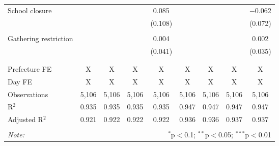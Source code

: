 \begin{table}[!htbp]
\begin{tabular}{@{\extracolsep{-15pt}}lcccccccc}
 School closure &  &  &  & 0.085 &  &  &  & $-$0.062 \\ 
  &  &  &  & (0.108) &  &  &  & (0.072) \\ 
  & & & & & & & & \\ 
 Gathering restriction &  &  &  & 0.004 &  &  &  & 0.002 \\ 
  &  &  &  & (0.041) &  &  &  & (0.035) \\ 
  & & & & & & & & \\ 
\hline \\[-1.8ex] 
Prefecture FE & X & X & X & X & X & X & X & X \\ 
Day FE & X & X & X & X & X & X & X & X \\ 
Observations & 5,106 & 5,106 & 5,106 & 5,106 & 5,106 & 5,106 & 5,106 & 5,106 \\ 
R$^{2}$ & 0.935 & 0.935 & 0.935 & 0.935 & 0.947 & 0.947 & 0.947 & 0.947 \\ 
Adjusted R$^{2}$ & 0.921 & 0.922 & 0.922 & 0.922 & 0.936 & 0.936 & 0.937 & 0.937 \\ 
\hline 
\hline \\[-1.8ex] 
\textit{Note:}  & \multicolumn{8}{r}{$^{*}$p$<$0.1; $^{**}$p$<$0.05; $^{***}$p$<$0.01} \\ 
\end{tabular} 
\end{table} 
